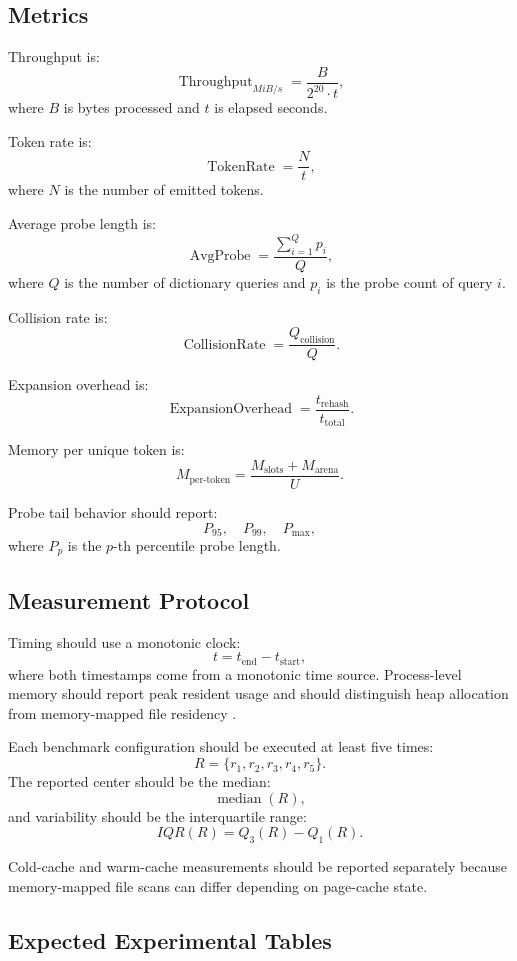 \documentclass[11pt,a4paper]{article}
\newcommand{\Throughput}{\operatorname{Throughput}}
\newcommand{\TokenRate}{\operatorname{TokenRate}}
\newcommand{\AvgProbe}{\operatorname{AvgProbe}}
\newcommand{\CollisionRate}{\operatorname{CollisionRate}}
\newcommand{\ExpansionOverhead}{\operatorname{ExpansionOverhead}}
\begin{document}
\subsection{Metrics}

Throughput is:
\[
\Throughput_{MiB/s}=
\frac{B}{2^{20}\cdot t},
\]
where \(B\) is bytes processed and \(t\) is elapsed seconds.

Token rate is:
\[
\TokenRate=
\frac{N}{t},
\]
where \(N\) is the number of emitted tokens.

Average probe length is:
\[
\AvgProbe=
\frac{\sum_{i=1}^{Q}p_i}{Q},
\]
where \(Q\) is the number of dictionary queries and \(p_i\) is the probe count of query \(i\).

Collision rate is:
\[
\CollisionRate=
\frac{Q_{\text{collision}}}{Q}.
\]

Expansion overhead is:
\[
\ExpansionOverhead=
\frac{t_{\text{rehash}}}{t_{\text{total}}}.
\]

Memory per unique token is:
\[
M_{\text{per-token}}=
\frac{M_{\text{slots}}+M_{\text{arena}}}{U}.
\]

Probe tail behavior should report:
\[
P_{95},\quad P_{99},\quad P_{\max},
\]
where \(P_p\) is the \(p\)-th percentile probe length.

\subsection{Measurement Protocol}

Timing should use a monotonic clock:
\[
t=t_{\text{end}}-t_{\text{start}},
\]
where both timestamps come from a monotonic time source. Process-level memory should report peak resident usage and should distinguish heap allocation from memory-mapped file residency \cite{LinuxClockGettime,LinuxGetrusage,LinuxProcStatus}.

Each benchmark configuration should be executed at least five times:
\[
R=\{r_1,r_2,r_3,r_4,r_5\}.
\]
The reported center should be the median:
\[
\operatorname{median}(R),
\]
and variability should be the interquartile range:
\[
IQR(R)=Q_3(R)-Q_1(R).
\]

Cold-cache and warm-cache measurements should be reported separately because memory-mapped file scans can differ depending on page-cache state.

\subsection{Expected Experimental Tables}
\end{document}
